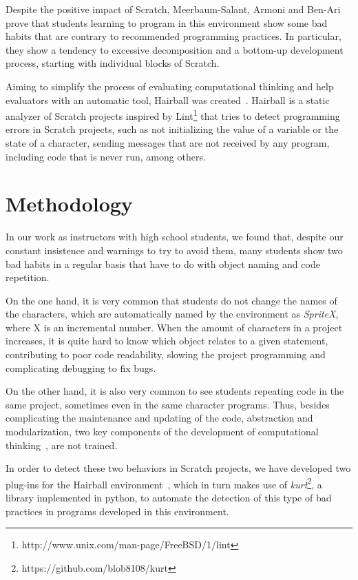 \documentclass[conference]{format/IEEEtran}
\begin{document}
Despite the positive impact of Scratch, Meerbaum-Salant, Armoni and Ben-Ari~\cite{meerbaum2011habits} prove that students learning to program in this environment show some bad habits that are contrary to recommended programming practices. In particular, they show a tendency to excessive decomposition and a bottom-up development process, starting with individual blocks of Scratch.

Aiming to simplify the process of evaluating computational thinking and help evaluators with an automatic tool, Hairball was created~\cite{boe2013hairball}. Hairball is a static analyzer of Scratch projects inspired by Lint\footnote{http://www.unix.com/man-page/FreeBSD/1/lint} that tries to detect programming errors in Scratch projects, such as not initializing the value of a variable or the state of a character, sending messages that are not received by any program, including code that is never run, among others.

\section{Methodology}
\label{sec:methodology}

In our work as instructors with high school students, we found that, despite our constant insistence and warnings to try to avoid them, many students show two bad habits in a regular basis that have to do with object naming and code repetition.
    
On the one hand, it is very common that students do not change the names of the characters, which are automatically named by the environment as \textit{SpriteX}, where X is an incremental number. When the amount of characters in a project increases, it is quite hard to know which object relates to a given statement, contributing to poor code readability, slowing the project programming and complicating debugging to fix bugs.

On the other hand, it is also very common to see students repeating code in the same project, sometimes even in the same character programs. Thus, besides complicating the maintenance and updating of the code, abstraction and modularization, two key components of the development of computational thinking~\cite{wing2008computational}, are not trained.

In order to detect these two behaviors in Scratch projects, we have developed two plug-ins for the Hairball environment~\cite{boe2013hairball}, which in turn makes use of \textit{kurt}\footnote{https://github.com/blob8108/kurt}, a library implemented in python, to automate the detection of this type of bad practices in programs developed in this environment.
\end{document}
